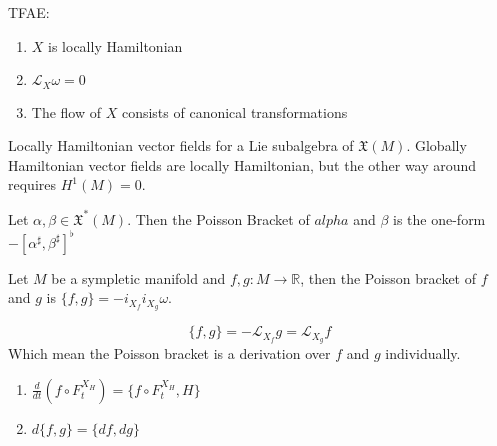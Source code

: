 \documentclass{article}
\begin{document}
\begin{prop}

TFAE:

\begin{enumerate}
    \item $X$ is locally Hamiltonian
    \item $\mathcal{L}_X \omega = 0$ 
    \item The flow of $X$ consists of canonical transformations
    
\end{enumerate}

\end{prop}

\begin{rmk}

Locally Hamiltonian vector fields for a Lie subalgebra of $\mathfrak{X}(M)$. Globally Hamiltonian vector fields are locally Hamiltonian, but the other way around requires $H^1(M) = 0$. 

\end{rmk}

\begin{defn}

Let $\alpha, \beta \in \mathfrak{X}^*(M)$. Then the Poisson Bracket of $alpha$ and $\beta$ is the one-form $-[\alpha^{\sharp}, \beta^{\sharp}]^{\flat}$

\end{defn}

\begin{defn}

Let $M$ be a sympletic manifold and $f,g: M \to \mathbb{R}$, then the Poisson bracket of $f$ and $g$ is $ \{f,g\} = - i_{X_f} i_{X_g} \omega$.

\end{defn}

\begin{prop}
\[\{f,g\} = - \mathcal{L}_{X_f}g = \mathcal{L}_{X_g}f\]
\indent Which mean the Poisson bracket is a derivation over $f$ and $g$ individually.
\end{prop}

\begin{cor}
\hfill
\begin{enumerate}
    \item $\frac{d}{dt}(f \circ F^{X_H}_t) = \{f \circ F^{X_H}_t, H\}$
    \item $d\{f,g\} = \{df, dg\}$
\end{enumerate}

\end{cor}
\end{document}

